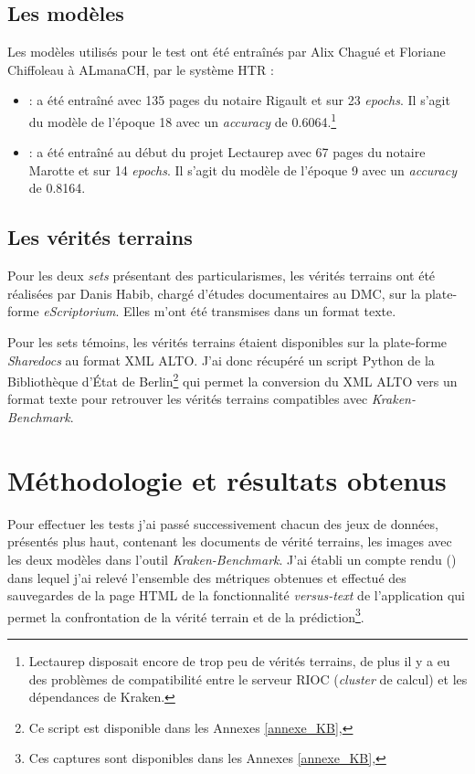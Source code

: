 \subsection{Les modèles} 
Les modèles utilisés pour le test ont été entraînés par Alix Chagué et Floriane Chiffoleau à ALmanaCH, par le système HTR :

\begin{itemize}
    \item {} : a été entraîné avec 135 pages du notaire Rigault et sur 23 \textit{epochs}. Il s'agit du modèle de l'époque 18 avec un \textit{accuracy} de 0.6064.\footnote{Lectaurep disposait encore de trop peu de vérités terrains, de plus il y a eu des problèmes de compatibilité entre le serveur RIOC (\textit{cluster} de calcul) et les dépendances de Kraken.}  
    \item {} : a été entraîné au début du projet Lectaurep avec 67 pages du notaire Marotte et sur 14 \textit{epochs}. Il s'agit du modèle de l'époque 9 avec un \textit{accuracy} de 0.8164.
\end{itemize}

\subsection{Les vérités terrains}

Pour les deux \textit{sets} présentant des particularismes, les vérités terrains ont été réalisées par Danis Habib, chargé d'études documentaires au DMC, sur la plate-forme \textit{eScriptorium}. Elles m'ont été transmises dans un format texte.

Pour les sets témoins, les vérités terrains étaient disponibles sur la plate-forme \textit{Sharedocs} au format XML ALTO. J'ai donc récupéré un script Python de la Bibliothèque d'État de Berlin\footnote{Ce script est disponible dans les Annexes \ref{annexe_KB}, } qui permet la conversion du XML ALTO vers un format texte pour retrouver les vérités terrains compatibles avec \textit{Kraken-Benchmark}. 
\newpage
\section{Méthodologie et résultats obtenus}

Pour effectuer les tests j'ai passé successivement chacun des jeux de données, présentés plus haut, contenant les documents de vérité terrains, les images avec les deux modèles dans l'outil \textit{Kraken-Benchmark}. J'ai établi un compte rendu () dans lequel j'ai relevé l'ensemble des métriques obtenues et effectué des sauvegardes de la page HTML de la fonctionnalité \textit{versus-text} de l'application qui permet la confrontation de la vérité terrain et de la prédiction\footnote{Ces captures sont disponibles dans les Annexes \ref{annexe_KB}, }.

